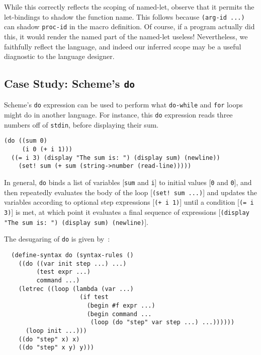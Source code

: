 \noindent
While this correctly reflects the scoping of named-let, observe that
it permits the let-bindings to shadow the function name. This follows
because \texttt{(arg-id ...)} can shadow
\texttt{proc-id} in the macro definition. Of course, if a program
actually did this, it would render the named part of the named-let
useless! Nevertheless, we faithfully reflect the language, and indeed
our inferred scope may be a useful diagnostic to the language designer.

\subsection{Case Study: Scheme's \texttt{do}}

Scheme's \texttt{do} expression can be used to perform what
\texttt{do-while} and \texttt{for} loops might do in another
language. For instance, this \texttt{do} expression reads three
numbers off of \texttt{stdin}, before displaying their sum.
\begin{lstlisting}
(do ((sum 0)
     (i 0 (+ i 1)))
  ((= i 3) (display "The sum is: ") (display sum) (newline))
    (set! sum (+ sum (string->number (read-line)))))
\end{lstlisting}

In general, \texttt{do} binds a list of variables [\texttt{sum} and
\texttt{i}] to initial values [\texttt{0} and \texttt{0}], and then
repeatedly evaluates the body of the loop [\texttt{(set! sum ...)}]  and
updates the variables according to optional step expressions
[\texttt{(+ i 1)}] until a condition [\texttt{(= i 3)}] is met, at which
point it evaluates a final sequence of expressions [\texttt{(display
  "The sum is: ") (display sum) (newline)}].

The desugaring of \texttt{do} is given by~\cite[derived forms]{scheme5}:
\begin{lstlisting}
  (define-syntax do (syntax-rules ()
    ((do ((var init step ...) ...)
         (test expr ...)
         command ...)
    (letrec ((loop (lambda (var ...)
                     (if test
                       (begin #f expr ...)
                       (begin command ...
                        (loop (do "step" var step ...) ...))))))
      (loop init ...)))
    ((do "step" x) x)
    ((do "step" x y) y)))
\end{lstlisting}

